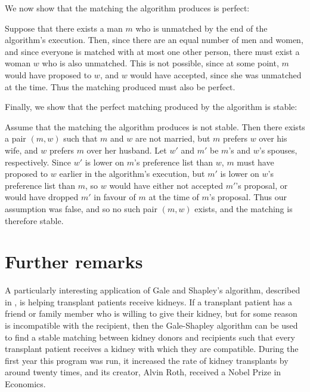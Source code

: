 \documentclass[11pt]{article}
\begin{document}
\noindent
We now show that the matching the algorithm produces is perfect:
\newline

Suppose that there exists a man $m$ who is unmatched by the end of the algorithm's execution.
Then, since there are an equal number of men and women, and since everyone is matched with at most one other person, there must exist a woman $w$ who is also unmatched.
This is not possible, since at some point, $m$ would have proposed to $w$, and $w$ would have accepted, since she was unmatched at the time.
Thus the matching produced must also be perfect.
\newline

\noindent
Finally, we show that the perfect matching produced by the algorithm is stable:
\newline

Assume that the matching the algorithm produces is not stable.
Then there exists a pair $(m,w)$ such that $m$ and $w$ are not married, but $m$ prefers $w$ over his wife, and $w$ prefers $m$ over her husband.
Let $w'$ and $m'$ be $m$'s and $w$'s spouses, respectively.
Since $w'$ is lower on $m$'s preference list than $w$, $m$ must have proposed to $w$ earlier in the algorithm's execution, but $m'$ is lower on $w$'s preference list than $m$, so $w$ would have either not accepted $m'$'s proposal, or would have dropped $m'$ in favour of $m$ at the time of $m$'s proposal.
Thus our assumption was false, and so no such pair $(m,w)$ exists, and the matching is therefore stable. \cite{Kleinberg}



\section{Further remarks}

A particularly interesting application of Gale and Shapley's algorithm, described in \cite{Kidney}, is helping transplant patients receive kidneys.
If a transplant patient has a friend or family member who is willing to give their kidney, but for some reason is incompatible with the recipient, then the Gale-Shapley algorithm can be used to find a stable matching between kidney donors and recipients such that every transplant patient receives a kidney with which they are compatible.
During the first year this program was run, it increased the rate of kidney transplants by around twenty times, and its creator, Alvin Roth, received a Nobel Prize in Economics.




\end{document}

